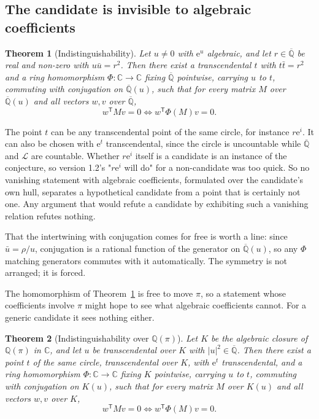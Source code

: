 \documentclass[11pt,a4paper]{article}
\theoremstyle{plain}
\newtheorem{theorem}{Theorem}[section]
\theoremstyle{definition}
\newcommand{\C}{\mathbb{C}}
\newcommand{\e}{\mathrm{e}}
\newcommand{\Q}{\mathbb{Q}}
\newcommand{\Alg}{\overline{\mathbb{Q}}}
\newcommand{\Logs}{\mathcal{L}}
\begin{document}
\subsection*{The candidate is invisible to algebraic coefficients}

\begin{theorem}[Indistinguishability]\label{thm:indist}
Let $u\neq0$ with $\e^{u}$ algebraic, and let $r\in\Alg$ be real and non-zero with
$u\bar u=r^{2}$. Then there exist a transcendental $t$ with $t\bar t=r^{2}$ and a ring
homomorphism $\Phi:\C\to\C$ fixing $\Alg$ pointwise, carrying $u$ to $t$, commuting with
conjugation on $\Alg(u)$, such that for every matrix $M$ over $\Alg(u)$ and all vectors $w,v$
over $\Alg$,
\[
  w^{\mathsf T}Mv=0 \iff w^{\mathsf T}\Phi(M)v=0 .
\]
\end{theorem}

The point $t$ can be any transcendental point of the same circle, for instance $r\e^{i}$. It can
also be chosen with $\e^{t}$ transcendental, since the circle is uncountable while $\Alg$ and
$\Logs$ are countable. Whether $r\e^{i}$ itself is a candidate is an instance of the conjecture, so
version 1.2's "$r\e^{i}$ will do" for a non-candidate was too quick. So no vanishing statement with
algebraic coefficients, formulated over the candidate's own hull, separates a hypothetical
candidate from a point that is certainly not one. Any argument that would refute a candidate by exhibiting such a vanishing
relation refutes nothing.

That the intertwining with conjugation comes for free is worth a line: since $\bar u=\rho/u$,
conjugation is a rational function of the generator on $\Alg(u)$, so any $\Phi$ matching
generators commutes with it automatically. The symmetry is not arranged; it is forced.

The homomorphism of Theorem~\ref{thm:indist} is free to move $\pi$, so a statement whose
coefficients involve $\pi$ might hope to see what algebraic coefficients cannot. For a generic
candidate it sees nothing either.

\begin{theorem}[Indistinguishability over $\Q(\pi)$]\label{thm:indist-pi}
Let $K$ be the algebraic closure of $\Q(\pi)$ in $\C$, and let $u$ be transcendental over $K$
with $|u|^{2}\in\Alg$. Then there exist a point $t$ of the same circle, transcendental over $K$,
with $\e^{t}$ transcendental, and a ring homomorphism $\Phi:\C\to\C$ fixing $K$ pointwise,
carrying $u$ to $t$, commuting with conjugation on $K(u)$, such that for every matrix $M$ over
$K(u)$ and all vectors $w,v$ over $K$,
\[
  w^{\mathsf T}Mv=0 \iff w^{\mathsf T}\Phi(M)v=0 .
\]
\end{theorem}
\end{document}

